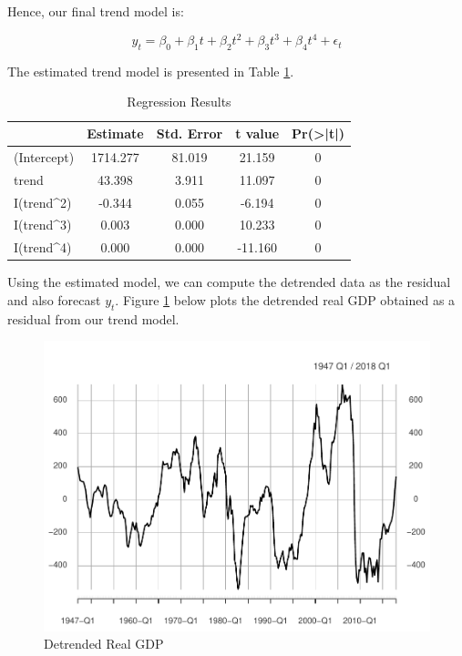 \documentclass[]{book}
\theoremstyle{definition}
\theoremstyle{definition}
\theoremstyle{definition}
\theoremstyle{remark}
\begin{document}
Hence, our final trend model is:

\begin{equation}
y_t=\beta_0 +\beta_1 t + \beta_2 t^2 + \beta_3 t^3 + \beta_4 t^4 +\epsilon_t
\end{equation}

The estimated trend model is presented in Table \ref{tab:ch5-table2}.

\begin{table}

\caption{\label{tab:ch5-table2}Regression Results}
\centering
\begin{tabular}[t]{lcccc}
\toprule
  & Estimate & Std. Error & t value & Pr(>|t|)\\
\midrule
(Intercept) & 1714.277 & 81.019 & 21.159 & 0\\
trend & 43.398 & 3.911 & 11.097 & 0\\
I(trend\textasciicircum{}2) & -0.344 & 0.055 & -6.194 & 0\\
I(trend\textasciicircum{}3) & 0.003 & 0.000 & 10.233 & 0\\
I(trend\textasciicircum{}4) & 0.000 & 0.000 & -11.160 & 0\\
\bottomrule
\end{tabular}
\end{table}

Using the estimated model, we can compute the detrended data as the
residual and also forecast \(y_t\). Figure \ref{fig:ch5-figure2} below
plots the detrended real GDP obtained as a residual from our trend
model.

\begin{figure}

{\centering \includegraphics[width=0.8\linewidth]{bookdown-demo_files/figure-latex/ch5-figure2-1} 

}

\caption{Detrended Real GDP}\label{fig:ch5-figure2}
\end{figure}
\end{document}

